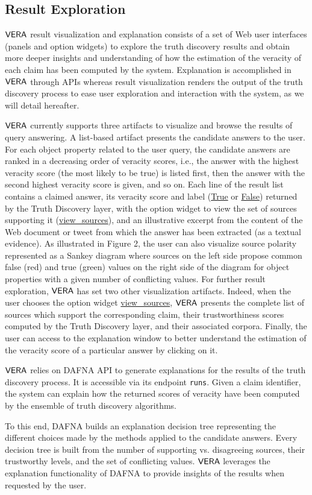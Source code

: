 \subsection{Result Exploration}\label{visu}
$\mathsf{VERA}$  result visualization and explanation
 consists of a set of Web user interfaces (panels and
option widgets) to explore the truth discovery results 
 and obtain more deeper insights and understanding of 
how the estimation of the veracity of each claim has been computed
by the system.   
Explanation is accomplished
in $\mathsf{VERA}$ through APIs whereas result visualization
renders the output of the truth discovery process to ease
user exploration and interaction with the system, as we will detail hereafter.


$\mathsf{VERA}$ currently supports three artifacts to visualize
and browse  the results of query answering.
A list-based artifact presents the candidate
answers to the user. For each object property 
related to the user query, the candidate answers are ranked
 in a decreasing order of veracity scores, 
 i.e., the answer with the highest veracity score (the most likely to be true) is listed
first, then the answer with the second highest veracity score is given,
and so on. Each  line of the result list contains a claimed
answer, its  veracity score and label (\url{True} or \url{False})
returned by the Truth Discovery layer, with the option widget to view 
the set of sources supporting it (\url{view_sources}), and an illustrative
excerpt from the content of the Web document or tweet from which the answer has
been extracted (as a textual evidence).  As illustrated in Figure 2, the user can also visualize source polarity represented as a Sankey diagram where sources on the left side propose common false (red) and true (green) values on the right side of the diagram for object properties with a given number of conflicting values. 
For further result exploration, $\mathsf{VERA}$ 
has set two other visualization artifacts. Indeed, when the user
chooses the option widget \url{view_sources}, $\mathsf{VERA}$  presents the
complete list of sources which support the corresponding claim, their
trustworthiness scores computed by the Truth Discovery layer, and their
associated corpora. Finally, the user can access to the explanation
window to better understand the  estimation of the veracity
score of a particular answer by clicking on it.


$\mathsf{VERA}$ relies on DAFNA API \cite{Wagui15} to generate explanations for the results of the truth discovery process. 
It is accessible via its endpoint \texttt{runs}. Given a claim identifier, the system can explain how the returned scores of veracity have been
computed by the  ensemble of truth discovery algorithms.  

To this end, DAFNA builds an explanation decision tree representing the different
choices made by the methods applied to the candidate answers. 
Every decision tree is  built from the
number of supporting vs. disagreeing sources,  their trustworthy levels, and the set of conflicting values. $\mathsf{VERA}$ leverages the explanation functionality of DAFNA  to provide insights of the results when requested by the
user.
